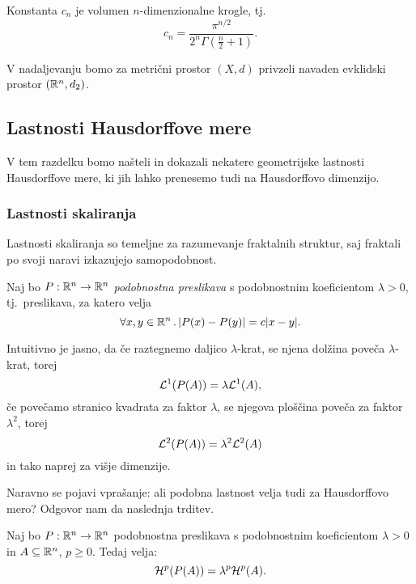 \begin{opomba}
    Konstanta \(c_n\) je volumen \(n\)-dimenzionalne krogle, tj. 
    \[c_n = \frac{\pi^{n/2}}{2^n \Gamma(\frac{n}{2} + 1)}.\]
\end{opomba}

V nadaljevanju bomo za metrični prostor \((X, d)\)  privzeli navaden evklidski prostor \((\mathbb{R}^n, d_2)\).

\subsection{Lastnosti Hausdorffove mere}
V tem razdelku bomo našteli in dokazali nekatere geometrijske lastnosti Hausdorffove mere, ki jih lahko prenesemo tudi na Hausdorffovo dimenzijo.

\subsubsection{Lastnosti skaliranja}
Lastnosti skaliranja so temeljne za razumevanje fraktalnih struktur, saj fraktali po svoji naravi izkazujejo samopodobnost. 

Naj bo \(P: \mathbb{R}^n \to \mathbb{R}^n\) \emph{podobnostna preslikava} s podobnostnim koeficientom \(\lambda > 0\), tj.\ preslikava, za katero velja
\[\forall x, y \in \mathbb{R}^n \,.\, |P(x) - P(y)| = c|x - y|.\]

Intuitivno je jasno, da če raztegnemo daljico \(\lambda\)-krat, se njena dolžina poveča \(\lambda\)-krat, torej 
\[\mathcal{L}^1(P(A)) = \lambda\mathcal{L}^1(A),\]
če povečamo stranico kvadrata za faktor \(\lambda\), se njegova ploščina poveča za faktor \(\lambda^2\), torej 
\[\mathcal{L}^2(P(A)) = \lambda^2\mathcal{L}^2(A)\]
in tako naprej za višje dimenzije.

Naravno se pojavi vprašanje: ali podobna lastnost velja tudi za Hausdorffovo mero? Odgovor nam da naslednja trditev.

\begin{trditev}
    \label{skale}
    Naj bo \(P: \mathbb{R}^n \to \mathbb{R}^n\) podobnostna preslikava s podobnostnim koeficientom \(\lambda > 0\) in \(A \subseteq \mathbb{R}^n\), \(p \geq 0\). Tedaj velja:
    \[\mathcal{H}^p(P(A)) = \lambda^p \mathcal{H}^p(A).\]
\end{trditev}

